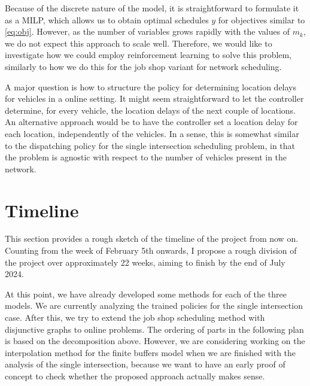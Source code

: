 \documentclass{article}
\begin{document}

Because of the discrete nature of the model, it is straightforward to formulate
it as a MILP, which allows us to obtain optimal schedules $y$ for objectives
similar to \eqref{eq:obj}. However, as the number of variables grows rapidly
with the values of $m_{k}$, we do not expect this approach to scale well.
Therefore, we would like to investigate how we could employ reinforcement
learning to solve this problem, similarly to how we do this for the job shop
variant for network scheduling.

A major question is how to structure the policy for determining location delays
for vehicles in a online setting. It might seem straightforward to let the
controller determine, for every vehicle, the location delays of the next couple
of locations. An alternative approach would be to have the controller set a
location delay for each location, independently of the vehicles. In a sense,
this is somewhat similar to the dispatching policy for the single intersection
scheduling problem, in that the problem is agnostic with respect to the number
of vehicles present in the network.

\section{Timeline}

This section provides a rough sketch of the timeline of the project from now on.
Counting from the week of February 5th onwards, I propose a rough division of
the project over approximately 22 weeks, aiming to finish by the end of July
2024.

At this point, we have already developed some methods for each of the three
models. We are currently analyzing the trained policies for the single
intersection case. After this, we try to extend the job shop scheduling method
with disjunctive graphs to online problems. The ordering of parts in the
following plan is based on the decomposition above. However, we are considering
working on the interpolation method for the finite buffers model when we are
finished with the analysis of the single intersection, because we want to have
an early proof of concept to check whether the proposed approach actually makes
sense.
\end{document}
